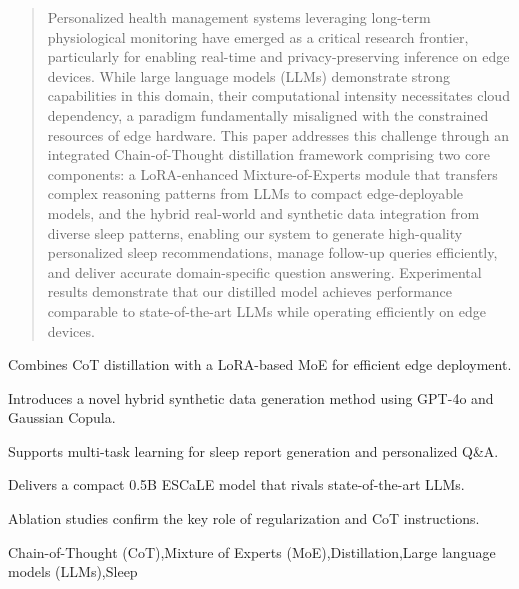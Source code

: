 \documentclass[preprint,12pt]{elsarticle}
\begin{document}
\begin{frontmatter}
\begin{abstract}
Personalized health management systems leveraging long-term physiological monitoring have emerged as a critical research frontier, particularly for enabling real-time and privacy-preserving inference on edge devices. While large language models (LLMs) demonstrate strong capabilities in this domain, their computational intensity necessitates cloud dependency, a paradigm fundamentally misaligned with the constrained resources of edge hardware. This paper addresses this challenge through an integrated Chain-of-Thought distillation framework comprising two core components: a LoRA-enhanced Mixture-of-Experts module that transfers complex reasoning patterns from LLMs to compact edge-deployable models, and the hybrid real-world and synthetic data integration from diverse sleep patterns, enabling our system to generate high-quality personalized sleep recommendations, manage follow-up queries efficiently, and deliver accurate domain-specific question answering. Experimental results demonstrate that our distilled model achieves performance comparable to state-of-the-art LLMs while operating efficiently on edge devices. 
\end{abstract}



\begin{highlights}
\item Combines CoT distillation with a LoRA-based MoE for efficient edge deployment.
\item Introduces a novel hybrid synthetic data generation method using GPT-4o and Gaussian Copula.
\item Supports multi-task learning for sleep report generation and personalized Q\&A.
\item Delivers a compact 0.5B ESCaLE model that rivals state-of-the-art LLMs.
\item Ablation studies confirm the key role of regularization and CoT instructions.
\end{highlights}

\begin{keyword}


Chain-of-Thought (CoT)\sep Mixture of Experts (MoE)\sep Distillation\sep Large language models (LLMs)\sep Sleep
\end{keyword}

\end{frontmatter}
\end{document}
